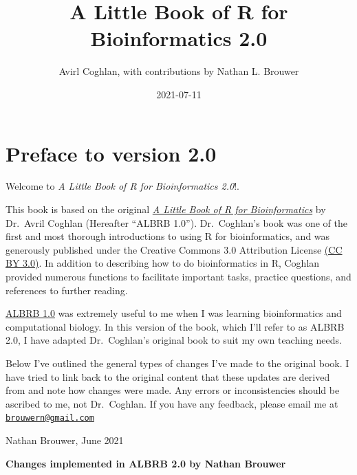 \documentclass[
]{book}
\title{A Little Book of R for Bioinformatics 2.0}
\author{Avirl Coghlan, with contributions by Nathan L. Brouwer}
\date{2021-07-11}
\begin{document}
\maketitle

{
\setcounter{tocdepth}{1}
\tableofcontents
}
\hypertarget{preface-to-version-2.0}{%
\chapter*{Preface to version 2.0}\label{preface-to-version-2.0}}

Welcome to \emph{A Little Book of R for Bioinformatics 2.0}!.

This book is based on the original \href{https://a-little-book-of-r-for-bioinformatics.readthedocs.io/en/latest/}{\emph{A Little Book of R for Bioinformatics}} by Dr.~Avril Coghlan (Hereafter ``ALBRB 1.0''). Dr.~Coghlan's book was one of the first and most thorough introductions to using R for bioinformatics, and was generously published under the Creative Commons 3.0 Attribution License \href{https://creativecommons.org/licenses/by/3.0/}{(CC BY 3.0)}. In addition to describing how to do bioinformatics in R, Coghlan provided numerous functions to facilitate important tasks, practice questions, and references to further reading.

\href{https://a-little-book-of-r-for-bioinformatics.readthedocs.io/en/latest/}{ALBRB 1.0} was extremely useful to me when I was learning bioinformatics and computational biology. In this version of the book, which I'll refer to as ALBRB 2.0, I have adapted Dr.~Coghlan's original book to suit my own teaching needs.

Below I've outlined the general types of changes I've made to the original book. I have tried to link back to the original content that these updates are derived from and note how changes were made. Any errors or inconsistencies should be ascribed to me, not Dr.~Coghlan. If you have any feedback, please email me at \href{mailto:brouwern@gmail.com}{\nolinkurl{brouwern@gmail.com}}

Nathan Brouwer, June 2021

\textbf{Changes implemented in ALBRB 2.0 by Nathan Brouwer}
\end{document}
